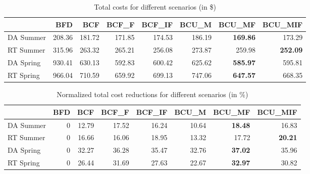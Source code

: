\begin{table}[ht]
\centering
\begin{tabular}{lrrrrrrr}
\toprule
{} &     BFD &     BCF &   BCF\_F &  BCF\_IF &   BCU\_M &  BCU\_MF &  BCU\_MIF \\
\midrule
DA Summer &  208.36 &  181.72 &  171.85 &  174.53 &  186.19 &  \textbf{169.86} &   173.29 \\
RT Summer &  315.96 &  263.32 &  265.21 &  256.08 &  273.87 &  259.98 &   \textbf{252.09} \\
DA Spring &  930.41 &  630.13 &  592.83 &  600.42 &  625.62 &  \textbf{585.97} &   595.81 \\
RT Spring &  966.04 &  710.59 &  659.92 &  699.13 &  747.06 &  \textbf{647.57} &   668.35 \\
\bottomrule
\end{tabular}
\caption{Total costs for different scenarios (in \$)}
\end{table}

\begin{table}[ht]
\centering
\begin{tabular}{lrrrrrrr}
\toprule
{} &  BFD &    BCF &  BCF\_F &  BCF\_IF &  BCU\_M &  BCU\_MF &  BCU\_MIF \\
\midrule
DA Summer &    0 &  12.79 &  17.52 &   16.24 &  10.64 &   \textbf{18.48} &    16.83 \\
RT Summer &    0 &  16.66 &  16.06 &   18.95 &  13.32 &   17.72 &    \textbf{20.21} \\
DA Spring &    0 &  32.27 &  36.28 &   35.47 &  32.76 &   \textbf{37.02} &    35.96 \\
RT Spring &    0 &  26.44 &  31.69 &   27.63 &  22.67 &   \textbf{32.97} &    30.82 \\
\bottomrule
\end{tabular}
\caption{Normalized total cost reductions for different scenarios (in \%)}
\end{table}





